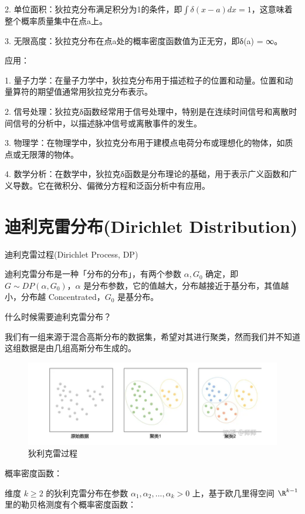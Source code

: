 \documentclass[12pt, a4paper, oneside]{ctexbook}
\begin{document}
2. 单位面积：狄拉克分布满足积分为1的条件，即$∫δ(x - a) dx = 1$，这意味着整个概率质量集中在点a上。

3. 无限高度：狄拉克分布在点a处的概率密度函数值为正无穷，即δ(a) = ∞。

 应用：

1. 量子力学：在量子力学中，狄拉克分布用于描述粒子的位置和动量。位置和动量算符的期望值通常用狄拉克分布表示。

2. 信号处理：狄拉克δ函数经常用于信号处理中，特别是在连续时间信号和离散时间信号的分析中，以描述脉冲信号或离散事件的发生。

3. 物理学：在物理学中，狄拉克分布用于建模点电荷分布或理想化的物体，如质点或无限薄的物体。

4. 数学分析：在数学中，狄拉克δ函数是分布理论的基础，用于表示广义函数和广义导数。它在微积分、偏微分方程和泛函分析中有应用。

\section{迪利克雷分布(Dirichlet Distribution)}

 迪利克雷过程(Dirichlet Process, DP)

迪利克雷分布是一种「分布的分布」，有两个参数 $\alpha, G_0$ 确定，即 $G \sim DP(\alpha, G_0)$，$\alpha$ 是分布参数，它的值越大，分布越接近于基分布，其值越小，分布越 Concentrated，$G_0$ 是基分布。

 什么时候需要迪利克雷分布？

我们有一组来源于混合高斯分布的数据集，希望对其进行聚类，然而我们并不知道这组数据是由几组高斯分布生成的。

\begin{figure}[H]
  \centering
  \includegraphics[width=1\textwidth]{image/狄利克雷过程.png}
  \caption{狄利克雷过程}
  \label{fig:example}
\end{figure}

 概率密度函数：

维度 $k \geq 2$ 的狄利克雷分布在参数 $\alpha_1, \alpha_2, ..., \alpha_k > 0$ 上，基于欧几里得空间 $\R^{k - 1}$ 里的勒贝格测度有个概率密度函数：
\end{document}
